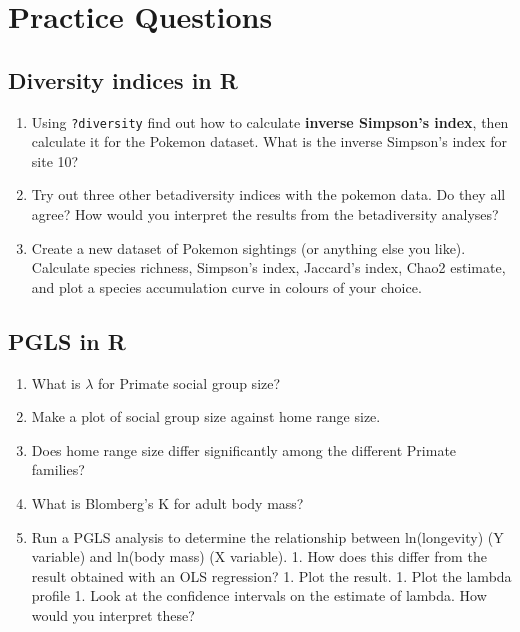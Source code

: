 \documentclass[]{book}
\providecommand{\tightlist}{%
  \setlength{\itemsep}{0pt}\setlength{\parskip}{0pt}}
\begin{document}
\chapter{Practice Questions}\label{practice-questions}

\section{Diversity indices in R}\label{diversity-indices-in-r-1}

\begin{enumerate}
\def\labelenumi{\arabic{enumi}.}
\tightlist
\item
  Using \texttt{?diversity} find out how to calculate \textbf{inverse
  Simpson's index}, then calculate it for the Pokemon dataset. What is
  the inverse Simpson's index for site 10?
\item
  Try out three other betadiversity indices with the pokemon data. Do
  they all agree? How would you interpret the results from the
  betadiversity analyses?
\item
  Create a new dataset of Pokemon sightings (or anything else you like).
  Calculate species richness, Simpson's index, Jaccard's index, Chao2
  estimate, and plot a species accumulation curve in colours of your
  choice.
\end{enumerate}

\section{PGLS in R}\label{pgls-in-r}

\begin{enumerate}
\def\labelenumi{\arabic{enumi}.}
\tightlist
\item
  What is \(\lambda\) for Primate social group size?
\item
  Make a plot of social group size against home range size.
\item
  Does home range size differ significantly among the different Primate
  families?
\item
  What is Blomberg's K for adult body mass?
\item
  Run a PGLS analysis to determine the relationship between
  ln(longevity) (Y variable) and ln(body mass) (X variable). 1. How does
  this differ from the result obtained with an OLS regression? 1. Plot
  the result. 1. Plot the lambda profile 1. Look at the confidence
  intervals on the estimate of lambda. How would you interpret these?
\end{enumerate}
\end{document}
